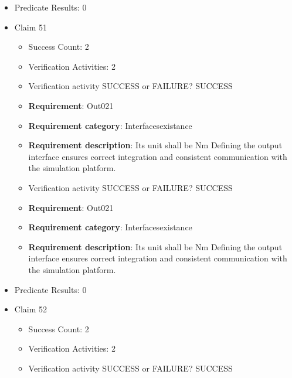 \documentclass{article}
\begin{document}
\begin{itemize}
\begin{itemize}
					\item Verification activity SUCCESS or FAILURE? SUCCESS
		
						\item \textbf{Requirement}: Out020 
						\item \textbf{Requirement category}: Interfacesexistance 
						\item \textbf{Requirement description}: Its unit shall be Nm Defining the output interface ensures correct integration and consistent communication with the simulation platform.
					
				\end{itemize}
				
									    
				\item Predicate Results: 0

  				  \item Claim 51
				\begin{itemize}
			    	\item Success Count: 2 
			    	\item Verification Activities: 2
					\item Verification activity SUCCESS or FAILURE? SUCCESS
		
						\item \textbf{Requirement}: Out021 
						\item \textbf{Requirement category}: Interfacesexistance 
						\item \textbf{Requirement description}: Its unit shall be Nm Defining the output interface ensures correct integration and consistent communication with the simulation platform.
					
					\item Verification activity SUCCESS or FAILURE? SUCCESS
		
						\item \textbf{Requirement}: Out021 
						\item \textbf{Requirement category}: Interfacesexistance 
						\item \textbf{Requirement description}: Its unit shall be Nm Defining the output interface ensures correct integration and consistent communication with the simulation platform.
					
				\end{itemize}
				
									    
				\item Predicate Results: 0

  				  \item Claim 52
				\begin{itemize}
			    	\item Success Count: 2 
			    	\item Verification Activities: 2
					\item Verification activity SUCCESS or FAILURE? SUCCESS
		

\end{itemize}
\end{itemize}
\end{document}
